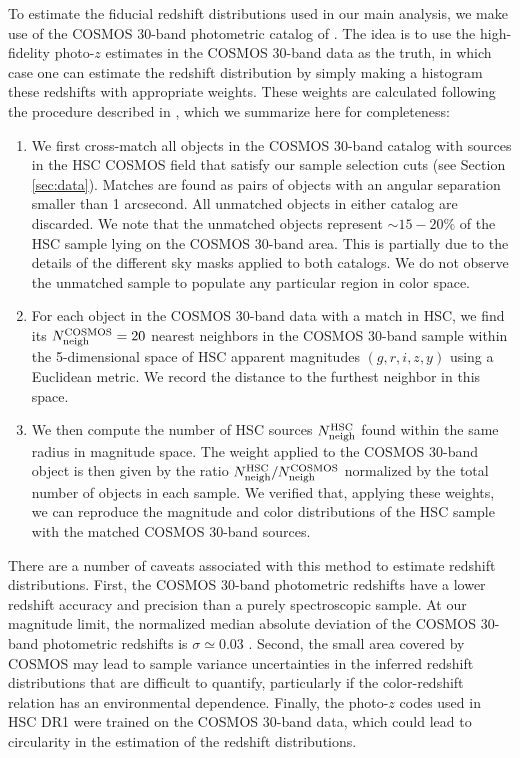 \documentclass[a4paper,11pt]{article}
\begin{document}
    To estimate the fiducial redshift distributions used in our main analysis, we make use of the COSMOS 30-band photometric catalog of \cite{2016ApJS..224...24L}. The idea is to use the high-fidelity photo-$z$ estimates in the COSMOS 30-band data as the truth, in which case one can estimate the redshift distribution by simply making a histogram these redshifts with appropriate weights. These weights are calculated following the procedure described in \cite{2017MNRAS.465.1454H,2019PASJ...71...43H}, which we summarize here for completeness:
    \begin{enumerate}
      \item We first cross-match all objects in the COSMOS 30-band catalog with sources in the HSC COSMOS field that satisfy our sample selection cuts (see Section \ref{sec:data}). Matches are found as pairs of objects with an angular separation smaller than 1 arcsecond. All unmatched objects in either catalog are discarded. We note that the unmatched objects represent $\sim15-20\%$ of the HSC sample lying on the COSMOS 30-band area. This is partially due to the details of the different sky masks applied to both catalogs. We do not observe the unmatched sample to populate any particular region in color space.
      \item For each object in the COSMOS 30-band data with a match in HSC, we find its $N_{\rm neigh}^{\rm COSMOS}=20$ nearest neighbors in the COSMOS 30-band sample within the 5-dimensional space of HSC apparent magnitudes $(g,r,i,z,y)$ using a Euclidean metric. We record the distance to the furthest neighbor in this space.
      \item We then compute the number of HSC sources $N_{\rm neigh}^{\rm HSC}$ found within the same radius in magnitude space. The weight applied to the COSMOS 30-band object is then given by the ratio $N^{\rm HSC}_{\rm neigh}/N^{\rm COSMOS}_{\rm neigh}$ normalized by the total number of objects in each sample. We verified that, applying these weights, we can reproduce the magnitude and color distributions of the HSC sample with the matched COSMOS 30-band sources.
    \end{enumerate}
    There are a number of caveats associated with this method to estimate redshift distributions. First, the COSMOS 30-band photometric redshifts have a lower redshift accuracy and precision than a purely spectroscopic sample. At our magnitude limit, the normalized median absolute deviation of the COSMOS 30-band photometric redshifts is $\sigma\simeq0.03$ \cite{2016ApJS..224...24L}. Second, the small area covered by COSMOS may lead to sample variance uncertainties in the inferred redshift distributions that are difficult to quantify, particularly if the color-redshift relation has an environmental dependence. Finally, the photo-$z$ codes used in HSC DR1 were trained on the COSMOS 30-band data, which could lead to circularity in the estimation of the redshift distributions.
    
\end{document}
